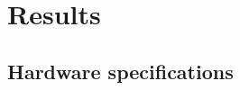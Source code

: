 




\chapter{Results}
\label{ch:results-appendix}

\section{Hardware specifications}
\label{sec:hardware-specifications}





